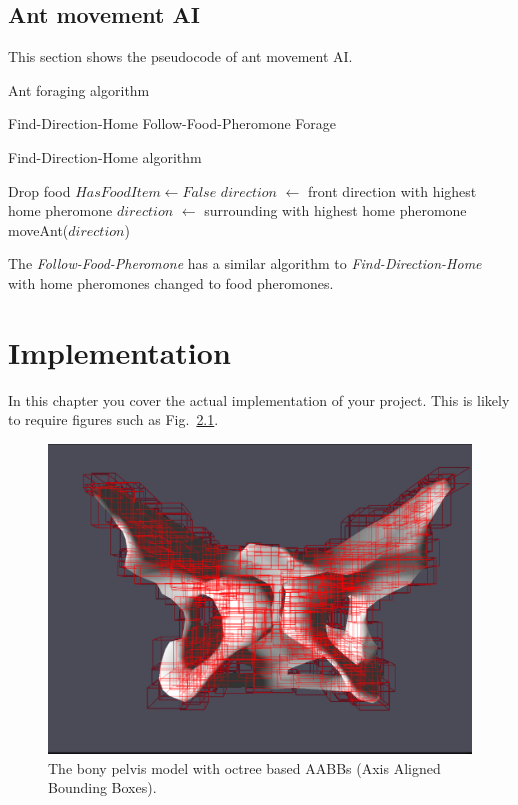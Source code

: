 \documentclass[a4paper, oneside, 11pt]{report}
\begin{document}
\section{Ant movement AI}
This section shows the pseudocode of ant movement AI.
\begin{algorithm}[th]
\caption{ Ant foraging algorithm }
\begin{algorithmic}[1]
		\State Find-Direction-Home
		\State Follow-Food-Pheromone
	\Else
		\State Forage
	\EndIf
\end{algorithmic}
\end{algorithm}

\begin{algorithm}[th]
	\caption{ Find-Direction-Home algorithm}
	\begin{algorithmic}[1]
			\State Drop food 
			\State $HasFoodItem \gets False$
		\Else
			\State $direction$ $\leftarrow$ front direction with highest home pheromone
				\State $direction$ $\leftarrow$ surrounding with highest home pheromone
			\EndIf
		\EndIf
		\State moveAnt($direction$)
	\end{algorithmic}
\end{algorithm}
The \textit{Follow-Food-Pheromone} has a similar algorithm to \textit{Find-Direction-Home} with home pheromones changed to food pheromones.

\chapter{Implementation}
\label{chap:Implementation}
In this chapter you cover the actual implementation of your project.
This is likely to require figures such as Fig.\ \ref{Pelvis_BVH}.

\begin{figure}[htb]
\includegraphics[width=1.0 \columnwidth]{pelvis_octree.png}
\caption{The bony pelvis model with octree based AABBs (Axis Aligned Bounding Boxes).}
\label{Pelvis_BVH}
\end{figure}
\end{document}
